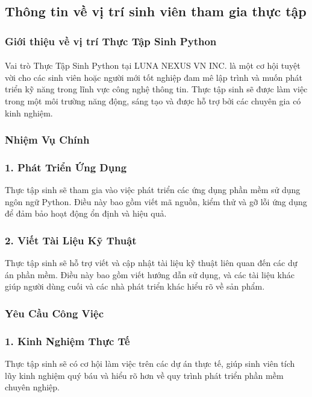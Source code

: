 \begin{flushleft}
		\subsection{Thông tin về vị trí sinh viên tham gia thực tập}
		\subsubsection*{Giới thiệu về vị trí Thực Tập Sinh Python}
		\paragraph{}
		\fontsize{16}{13}\selectfont Vai trò Thực Tập Sinh Python tại LUNA NEXUS VN INC. là một cơ hội tuyệt vời cho các sinh viên hoặc người mới tốt nghiệp đam mê lập trình và muốn phát triển kỹ năng trong lĩnh vực công nghệ thông tin. Thực tập sinh sẽ được làm việc trong một môi trường năng động, sáng tạo và được hỗ trợ bởi các chuyên gia có kinh nghiệm.
		\subsubsection*{Nhiệm Vụ Chính}
		\subsubsection*{1. Phát Triển Ứng Dụng}
		\fontsize{16}{13}\selectfont Thực tập sinh sẽ tham gia vào việc phát triển các ứng dụng phần mềm sử dụng ngôn ngữ Python. Điều này bao gồm viết mã nguồn, kiểm thử và gỡ lỗi ứng dụng để đảm bảo hoạt động ổn định và hiệu quả.
		\subsubsection*{2. Viết Tài Liệu Kỹ Thuật}
		\fontsize{16}{13}\selectfont Thực tập sinh sẽ hỗ trợ viết và cập nhật tài liệu kỹ thuật liên quan đến các dự án phần mềm. Điều này bao gồm viết hướng dẫn sử dụng, và các tài liệu khác giúp người dùng cuối và các nhà phát triển khác hiểu rõ về sản phẩm.
		\subsubsection*{Yêu Cầu Công Việc}
		\subsubsection*{1. Kinh Nghiệm Thực Tế}
		\fontsize{16}{13}\selectfont Thực tập sinh sẽ có cơ hội làm việc trên các dự án thực tế, giúp sinh viên tích lũy kinh nghiệm quý báu và hiểu rõ hơn về quy trình phát triển phần mềm chuyên nghiệp.


\end{flushleft}

